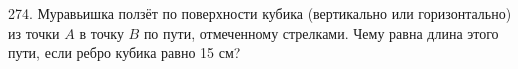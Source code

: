 274. Муравьишка ползёт по поверхности кубика (вертикально или горизонтально) из точки $A$ в точку $B$ по пути, отмеченному стрелками. Чему равна длина этого пути, если ребро кубика равно 15 см?
\begin{center}
\begin{figure}[ht!]
\end{figure}
\end{center}
